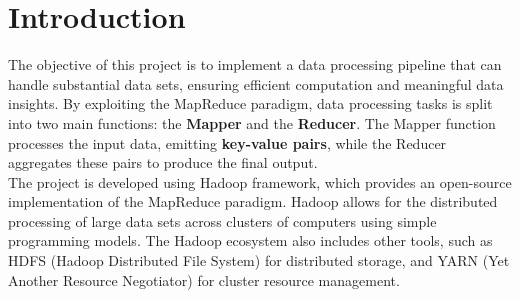 \newpage
\section{Introduction}
The objective of this project is to implement a data processing pipeline that can handle substantial data sets, ensuring efficient computation and meaningful data insights. By exploiting the MapReduce paradigm, data processing tasks is split into two main functions: the \textbf{Mapper} and the \textbf{Reducer}.\newline
The Mapper function processes the input data, emitting \textbf{key-value pairs}, while the Reducer aggregates these pairs to produce the final output.\\

\noindent The project is developed using Hadoop framework, which provides an open-source implementation of the MapReduce paradigm. Hadoop allows for the distributed processing of large data sets across clusters of computers using simple programming models. The Hadoop ecosystem also includes other tools, such as HDFS (Hadoop Distributed File System) for distributed storage, and YARN (Yet Another Resource Negotiator) for cluster resource management.\newline



